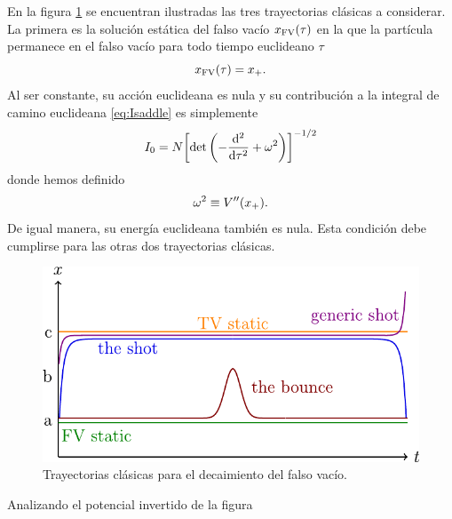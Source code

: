 En la figura \ref{fig:soluciones} se encuentran ilustradas las tres trayectorias clásicas a considerar. La primera es la solución estática del falso vacío $x_{\text{FV}}\qty(\tau)$ en la que la partícula permanece en el falso vacío para todo tiempo euclideano $\tau$ 
\begin{equation}
x_{\text{FV}}\qty(\tau) = x_+.
\end{equation}
Al ser constante, su acción euclideana es nula y su contribución a la integral de camino euclideana \eqref{eq:Isaddle}  es simplemente
\begin{equation}
	I_0 = N \qty[ \det\left(-\dv[2]{\tau} + \omega^2 \right) ]^{-1/2}
\end{equation}
donde hemos definido \cite{coleman1977fate} 
\begin{equation}
	\omega^2 \equiv V''\qty(x_+).
\end{equation}
De igual manera, su energía euclideana también es nula. Esta condición debe cumplirse para las otras dos trayectorias clásicas.

\begin{figure}
	\centering
	\includegraphics[scale=0.375]{FIGURAS/soluciones}
	\caption{Trayectorias clásicas para el decaimiento del falso vacío.}
	\label{fig:soluciones}
\end{figure}



Analizando el potencial invertido de la figura 

